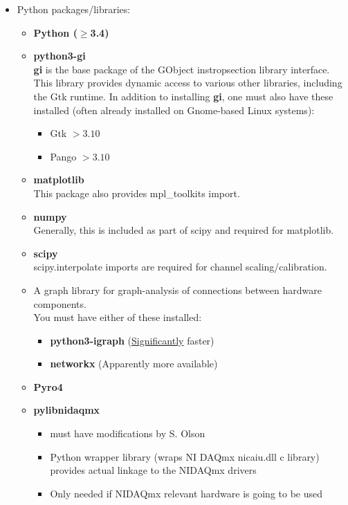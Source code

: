 \begin{itemize}
  \item Python packages/libraries:
    \begin{itemize}
      \item \textbf{Python ($\geq$3.4)}
      \item \textbf{python3-gi} \\
        \textbf{gi} is the base package of the GObject instropsection library
        interface.  This library provides dynamic access to various other
        libraries, including the Gtk runtime.  In addition to installing
        \textbf{gi}, one must also have these installed (often already installed
        on Gnome-based Linux systems):
        \begin{itemize}
          \item Gtk $> 3.10$
          \item Pango $> 3.10$
        \end{itemize}

      \item \textbf{matplotlib} \\
        This package also provides mpl\_toolkits import.
      \item \textbf{numpy} \\
        Generally, this is included as part of scipy and required for matplotlib.
      \item \textbf{scipy} \\
        scipy.interpolate imports are required for channel scaling/calibration.
      \item A graph library for graph-analysis of connections between hardware
        components.\\
        You must have either of these installed:
        \begin{itemize}
          \item \textbf{python3-igraph} (\underline{Significantly} faster)
          \item \textbf{networkx} (Apparently more available)
        \end{itemize}

      \item \textbf{Pyro4}

      \item \textbf{pylibnidaqmx}
        \begin{itemize}
          \item must have modifications by S. Olson
          \item Python wrapper library (wraps NI DAQmx nicaiu.dll c library)
            provides actual linkage to the NIDAQmx drivers
          \item Only needed if NIDAQmx relevant hardware is going to be used
        \end{itemize}


\end{itemize}
\end{itemize}
